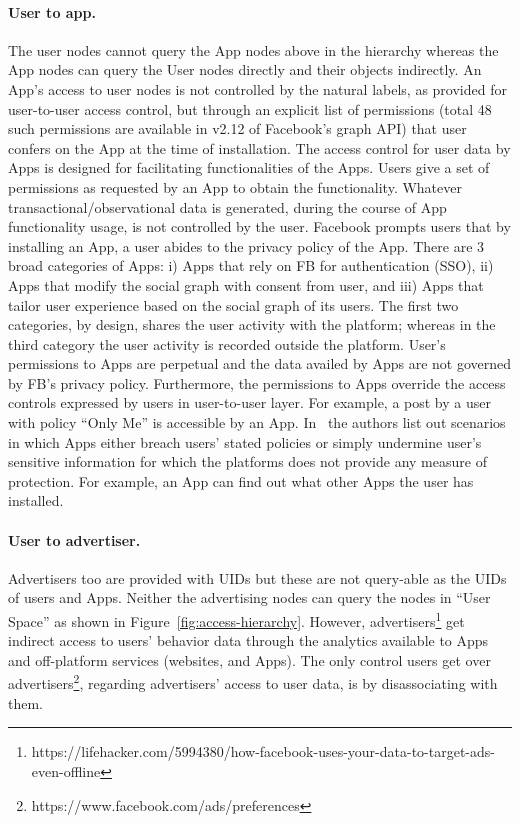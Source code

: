 \documentclass[runningheads]{llncs}
\begin{document}
\paragraph{User to app.} The user nodes cannot query the App nodes
above in the hierarchy whereas the App nodes can query the User nodes
directly and their objects indirectly. An App's access to user nodes
is not controlled by the natural labels, as provided for user-to-user
access control, but through an explicit list of permissions (total 48
such permissions are available in v2.12 of Facebook's graph API) that
user confers on the App at the time of installation. The access
control for user data by Apps is designed for facilitating
functionalities of the Apps. Users give a set of permissions as
requested by an App to obtain the functionality. Whatever
transactional/observational data is generated, during the course of
App functionality usage, is not controlled by the user. Facebook
prompts users that by installing an App, a user abides to the privacy
policy of the App. There are 3 broad categories of Apps: i) Apps that
rely on FB for authentication (SSO), ii) Apps that modify the social
graph with consent from user, and iii) Apps that tailor user
experience based on the social graph of its users. The first two
categories, by design, shares the user activity with the platform;
whereas in the third category the user activity is recorded outside
the platform. User's permissions to Apps are perpetual and the data
availed by Apps are not governed by FB's privacy policy. Furthermore,
the permissions to Apps override the access controls expressed by
users in user-to-user layer. For example, a post by a user with policy
``Only Me'' is accessible by an
App. In~\cite{isrdc-tr-2017-rks-vtp-privacy-fb-apps} the authors list
out scenarios in which Apps either breach users' stated policies or
simply undermine user's sensitive information for which the platforms
does not provide any measure of protection. For example, an App can
find out what other Apps the user has installed.
%
%
\paragraph{User to advertiser.} Advertisers too are provided with UIDs
but these are not query-able as the UIDs of users and Apps. Neither
the advertising nodes can query the nodes in ``User Space'' as shown
in Figure~\ref{fig:access-hierarchy}. However,
advertisers\footnote{https://lifehacker.com/5994380/how-facebook-uses-your-data-to-target-ads-even-offline}
get indirect access to users' behavior data through the analytics
available to Apps and off-platform services (websites, and Apps). The
only control users get over
advertisers\footnote{https://www.facebook.com/ads/preferences},
regarding advertisers' access to user data, is by disassociating with
them.
%
%
\end{document}
